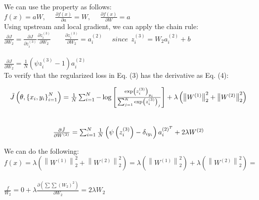 \documentclass[
	12pt, %
]{fphw}
\begin{document}
We can use the property as follows:\\ 


$f(x) = aW, \ \ \ \ \ \ \frac{\partial f(x)}{\partial a} = W,\ \ \ \ \ \ \frac{\partial f(x)}{\partial W} = a$\\

Using upstream and local gradient, we can apply the chain rule:\\

$\frac{\partial J}{\partial W_2} = \frac{\partial J}{\partial z_{i}^{(3)}} \frac{\partial z_{i}^{(3)}}{\partial W_2} \ \ \ \ \ \ \ \ \ \frac{\partial z_{i}^{(3)}}{\partial W_2} = a_{i}^{(2)} \ \ \ \ \ \ since \ \  z_{i}^{(3)} = W_2 a_{i}^{(2)} + b $\\ \\

$\frac{\partial J}{\partial W_2} = \frac{1}{N} (\psi z_{i}^{(3)} - 1) a_{i}^{(2)}$\\

To verify that the regularized loss in Eq. (3) has the derivative as Eq. (4):


\begin{equation}
\begin{gathered}
$$
\tilde{J}\left(\theta,\left\{x_{i}, y_{i}\right\}_{i=1}^{N}\right)=\frac{1}{N} \sum_{i=1}^{N}-\log \left[\frac{\exp \left(z_{i}^{(3)}\right)_{y_{i}}}{\sum_{j=1}^{K} \exp \left(z_{i}^{(3)}\right)_{j}}\right]+\lambda\left(\left\|W^{(1)}\right\|_{2}^{2}+\left\|W^{(2)}\right\|_{2}^{2}\right)
$$
\end{gathered}
\end{equation}
\\
\begin{equation}
\begin{gathered}
$$
\frac{\partial \tilde{J}}{\partial W^{(2)}}=\sum_{i=1}^{N} \frac{1}{N}\left(\psi\left(z_{i}^{(3)}\right)-\delta_{i y_{i}}\right) a_{i}^{(2)^{T}}+2 \lambda W^{(2)}
$$
\end{gathered}
\end{equation}

We can do the following:\\

$f(x) = \lambda\left(\left\|W^{(1)}\right\|_{2}^{2}+\left\|W^{(2)}\right\|_{2}^{2}\right) = \lambda\left(\left\|W^{(1)}\right\|_{2}^{2}\right) + \lambda\left(\left\|W^{(2)}\right\|_{2}^{2}\right) = $\\ \\

$\frac{f}{W_2} = 0 + \lambda \frac{\partial(\sum\sum(W_2)^2)}{\partial W_2} = 2\lambda W_2$\\ \\
\end{document}
